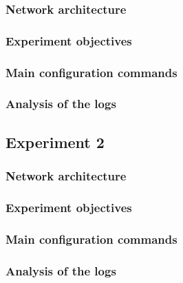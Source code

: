 \documentclass[a4paper,11pt,english]{article}
\begin{document}
        \subsubsection{Network architecture}

        \subsubsection{Experiment objectives}

        \subsubsection{Main configuration commands}

        \subsubsection{Analysis of the logs}


    \subsection{Experiment 2}
        \subsubsection{Network architecture}

        \subsubsection{Experiment objectives}

        \subsubsection{Main configuration commands}

        \subsubsection{Analysis of the logs}


\end{document}
